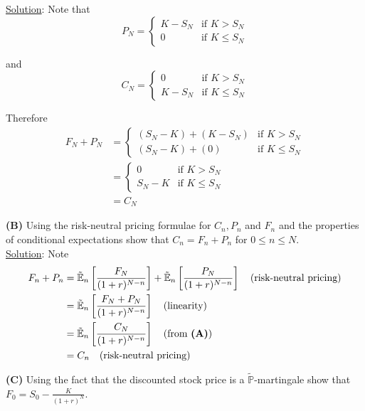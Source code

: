 \documentclass[12pt]{article}
\renewcommand{\P}{\mathbb P}
\newcommand{\E}{\mathbb E}
\begin{document}
\underline{Solution}: Note that
\begin{equation*}
	P_N = 
	\begin{cases}
		K - S_N & \text{if } K > S_N \\
		0 & \text{if } K \leq S_N
	\end{cases}
\end{equation*}

and
\begin{equation*}
	C_N = 
	\begin{cases}
		0 & \text{if } K > S_N \\
		K - S_N & \text{if } K \leq S_N
	\end{cases}
\end{equation*}

Therefore
\begin{align*}
	F_N + P_N &= 
	\begin{cases}
		(S_N - K) + (K - S_N) & \text{if } K > S_N \\
		(S_N - K) + (0) & \text{if } K \leq S_N
	\end{cases} \\
	&= 
	\begin{cases}
		0 & \text{if } K > S_N \\
		S_N - K & \text{if } K \leq S_N
	\end{cases} \\
	&= C_N
\end{align*}

{\bf (B)} Using the risk-neutral pricing formulae for $C_n, P_n$ and $F_n$ and the properties of conditional expectations show that $C_n = F_n + P_n$ for $0 \leq n \leq N$. \\

\underline{Solution}: Note
\begin{align*}
	F_n + P_n &= \tilde{\E}_n \left[ \frac{F_N}{(1 + r)^{N - n}} \right] + \tilde{\E}_n \left[ \frac{P_N}{(1 + r)^{N - n}} \right] \quad \text{(risk-neutral pricing)} \\
	&= \tilde{\E}_n \left[ \frac{F_N + P_N}{(1 + r)^{N - n}} \right] \quad \text{(linearity)} \\
	&= \tilde{\E}_n \left[ \frac{C_N}{(1 + r)^{N - n}} \right] \quad \text{(from {\bf (A)})} \\
	&= C_n \quad \text{(risk-neutral pricing)}
\end{align*}

{\bf (C)} Using the fact that the discounted stock price is a $\tilde{\P}$-martingale show that $F_0 = S_0 - \frac{K}{(1 + r)^N}$. \\
\end{document}
